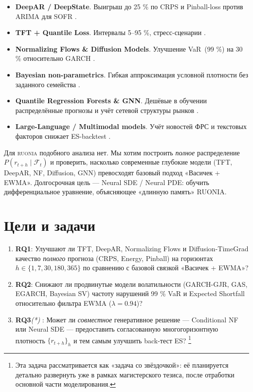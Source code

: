 \begin{itemize}
  \item \textbf{DeepAR / DeepState}.  Выигрыш до 25 \% по CRPS и
        Pinball-loss против ARIMA для SOFR \autocite{salinas2020deepar}.
  \item \textbf{TFT + Quantile Loss}.  Интервалы 5–95 \%, стресс-сценарии
         \autocite{lim2024tft,vaswani2024transformers}.
  \item \textbf{Normalizing Flows \& Diffusion Models}.  Улучшение
        VaR~(99 \%) на 30 \% относительно GARCH
        \autocite{rasouli2023flows,zangeneh2024diffusion,xu2024deep}.
  \item \textbf{Bayesian non-parametrics}.  Гибкая аппроксимация
        условной плотности без заданного семейства
        \autocite{alvarez2024bayesian}.
  \item \textbf{Quantile Regression Forests \& GNN}.  Дешёвые в
        обучении распределённые прогнозы и учёт сетевой структуры
        рынков \autocite{liu2024robust,hayashi2024graphnets}.
  \item \textbf{Large-Language / Multimodal models}.  Учёт новостей
        ФРС и текстовых факторов снижает ES-backtest
        \autocite{gao2024fedspeak,silva2024multimodal,chang2024forecasting}.
\end{itemize}

Для \textsc{ruonia} подобного анализа нет.  
Мы хотим построить \emph{полное} распределение
\(P(r_{t+h}\mid\mathcal F_t)\) и проверить, насколько современные
глубокие модели (TFT, DeepAR, NF, Diffusion, GNN) превосходят
базовый подход «Васичек + EWMA».  
Долгосрочная цель — Neural SDE / Neural PDE: обучить
дифференциальное уравнение, объясняющее «длинную память» RUONIA.

\section{Цели и задачи}

\begin{enumerate}
  \item \textbf{RQ1}: Улучшают ли TFT, DeepAR, Normalizing Flows и
        Diffusion-TimeGrad качество \emph{полного} прогноза
        (CRPS, Energy, Pinball) на горизонтах
        \(h \in \{1,7,30,180,365\}\)
        по сравнению с базовой связкой «Васичек + EWMA»?
  \item \textbf{RQ2}: Снижают ли продвинутые модели волатильности
        (GARCH-GJR, GAS, EGARCH, Bayesian SV) частоту нарушений
        99 \% VaR и Expected Shortfall
        относительно фильтра EWMA (\(\lambda=0.94\))?
  \item \textbf{RQ3}\emph{(*)} : Может ли \emph{совместное} генеративное решение
        — Conditional NF или Neural SDE — предоставить согласованную
        многогоризонтную плотность \(\{r_{t+h}\}_{h}\) и тем самым
        улучшить back-тест ES? \footnote{ 
        Эта задача рассматривается как «задача со звёздочкой»:
        её планируется детально развернуть уже в рамках магистерского
        тезиса, после отработки основной части моделирования.}
\end{enumerate}

